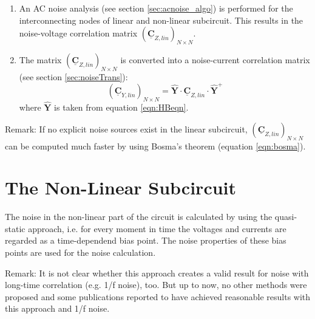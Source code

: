 \begin{enumerate}
\item An AC noise analysis (see section \ref{sec:acnoise_algo}) is
   performed for the interconnecting nodes of linear and non-linear
   subcircuit. This results in the noise-voltage correlation matrix
   $(\boldsymbol{\underline{C}}_{Z,lin})_{N\times N}$.
\item The matrix $(\boldsymbol{\underline{C}}_{Z,lin})_{N\times N}$
   is converted into a noise-current correlation matrix (see section
   \ref{sec:noiseTrans}):
   \begin{equation}
     (\boldsymbol{\underline{C}}_{Y,lin})_{N\times N} =
     \boldsymbol{\hat{Y}} \cdot
     \boldsymbol{\underline{C}}_{Z,lin} \cdot
     \boldsymbol{\hat{Y}}^+
   \end{equation}
   where $\boldsymbol{\hat{Y}}$ is taken from equation \ref{eqn:HBeqn}.
\end{enumerate}

Remark: If no explicit noise sources exist in the linear subcircuit,
$(\boldsymbol{\underline{C}}_{Z,lin})_{N\times N}$ can be computed
much faster by using Bosma's theorem (equation \ref{eqn:bosma}).


\section{The Non-Linear Subcircuit}

The noise in the non-linear part of the circuit is calculated
by using the quasi-static approach, i.e. for every moment in
time the voltages and currents are regarded as a time-dependend
bias point. The noise properties of these bias points are
used for the noise calculation.

\addvspace{12pt}

Remark: It is not clear whether this approach creates a valid result
for noise with long-time correlation (e.g. 1/f noise), too. But up
to now, no other methods were proposed and some publications
reported to have achieved reasonable results with this approach
and 1/f noise.

\addvspace{12pt}

